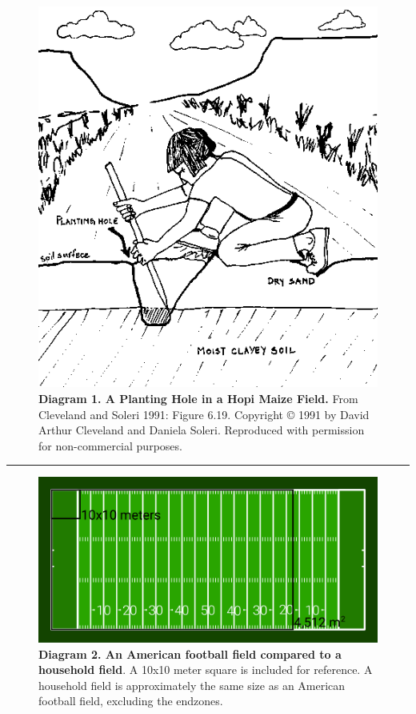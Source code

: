 \documentclass[12pt,]{article}
\begin{document}
\begin{figure}
\centering
\includegraphics{./images/planting.png}
\caption{\textbf{Diagram 1. A Planting Hole in a Hopi Maize Field.} From Cleveland and Soleri 1991: Figure 6.19. Copyright © 1991 by David Arthur Cleveland and Daniela Soleri. Reproduced with permission for non-commercial purposes.}
\end{figure}

\begin{center}\rule{0.5\linewidth}{\linethickness}\end{center}

\begin{figure}
\centering
\includegraphics{./images/American_Football_Field.png}
\caption{\textbf{Diagram 2. An American football field compared to a household field}. A 10x10 meter square is included for reference. A household field is approximately the same size as an American football field, excluding the endzones.}
\end{figure}
\end{document}
